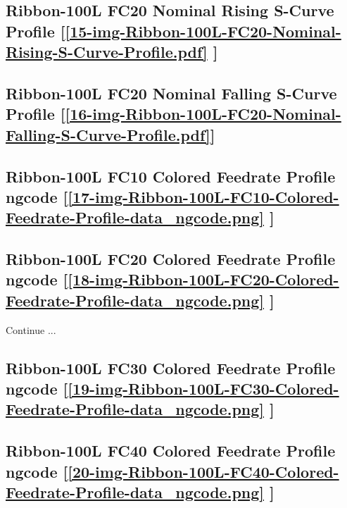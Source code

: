\subsection     {Ribbon-100L FC20 Nominal Rising S-Curve Profile
	[\ref      {15-img-Ribbon-100L-FC20-Nominal-Rising-S-Curve-Profile.pdf} ] }
\label{ssec-15-img-Ribbon-100L-FC20-Nominal-Rising-S-Curve-Profile.pdf}

\subsection     {Ribbon-100L FC20 Nominal Falling S-Curve Profile
	[\ref      {16-img-Ribbon-100L-FC20-Nominal-Falling-S-Curve-Profile.pdf}] }
\label{ssec-16-img-Ribbon-100L-FC20-Nominal-Falling-S-Curve-Profile.pdf}

\subsection       {Ribbon-100L FC10 Colored Feedrate Profile ngcode
	[\ref      {17-img-Ribbon-100L-FC10-Colored-Feedrate-Profile-data_ngcode.png} ] }
\label{ssec-17-img-Ribbon-100L-FC10-Colored-Feedrate-Profile-data_ngcode.png}

\subsection       {Ribbon-100L FC20 Colored Feedrate Profile ngcode
	[\ref      {18-img-Ribbon-100L-FC20-Colored-Feedrate-Profile-data_ngcode.png} ] }
\label{ssec-18-img-Ribbon-100L-FC20-Colored-Feedrate-Profile-data_ngcode.png}

Continue ...\\

\subsection       {Ribbon-100L FC30 Colored Feedrate Profile ngcode
	[\ref      {19-img-Ribbon-100L-FC30-Colored-Feedrate-Profile-data_ngcode.png} ] }
\label{ssec-19-img-Ribbon-100L-FC30-Colored-Feedrate-Profile-data_ngcode.png}

\subsection       {Ribbon-100L FC40 Colored Feedrate Profile ngcode
	[\ref      {20-img-Ribbon-100L-FC40-Colored-Feedrate-Profile-data_ngcode.png} ] }
\label{ssec-20-img-Ribbon-100L-FC40-Colored-Feedrate-Profile-data_ngcode.png}

